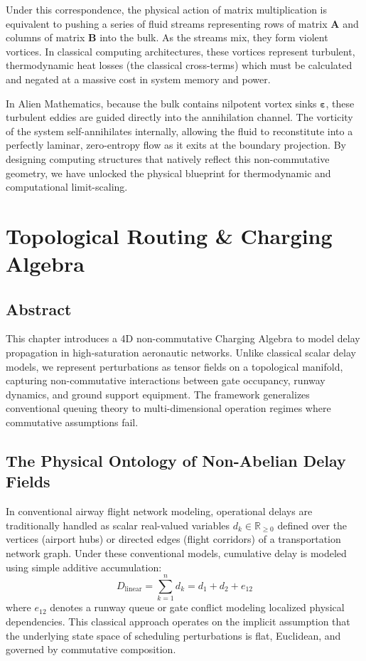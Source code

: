 \documentclass[11pt,a4paper]{book}
\begin{document}
Under this correspondence, the physical action of matrix multiplication is equivalent to pushing a series of fluid streams representing rows of matrix $\mathbf{A}$ and columns of matrix $\mathbf{B}$ into the bulk. 
As the streams mix, they form violent vortices. 
In classical computing architectures, these vortices represent turbulent, thermodynamic heat losses (the classical cross-terms) which must be calculated and negated at a massive cost in system memory and power.

In Alien Mathematics, because the bulk contains nilpotent vortex sinks $\boldsymbol{\varepsilon}$, these turbulent eddies are guided directly into the annihilation channel. 
The vorticity of the system self-annihilates internally, allowing the fluid to reconstitute into a perfectly laminar, zero-entropy flow as it exits at the boundary projection. 
By designing computing structures that natively reflect this non-commutative geometry, we have unlocked the physical blueprint for thermodynamic and computational limit-scaling.

\chapter{Topological Routing \& Charging Algebra}
\section*{Abstract}
This chapter introduces a 4D non-commutative Charging Algebra to model delay propagation in high-saturation aeronautic networks. Unlike classical scalar delay models, we represent perturbations as tensor fields on a topological manifold, capturing non-commutative interactions between gate occupancy, runway dynamics, and ground support equipment. The framework generalizes conventional queuing theory to multi-dimensional operation regimes where commutative assumptions fail.


\section{The Physical Ontology of Non-Abelian Delay Fields}

In conventional airway flight network modeling, operational delays are traditionally handled as scalar real-valued variables $d_k \in \mathbb{R}_{\geq 0}$ defined over the vertices (airport hubs) or directed edges (flight corridors) of a transportation network graph. Under these conventional models, cumulative delay is modeled using simple additive accumulation:
\begin{equation}
\label{eq:classical_delay}
D_{\text{linear}} = \sum_{k=1}^n d_k = d_1 + d_2 + e_{12}
\end{equation}
where $e_{12}$ denotes a runway queue or gate conflict modeling localized physical dependencies. This classical approach operates on the implicit assumption that the underlying state space of scheduling perturbations is flat, Euclidean, and governed by commutative composition.
\end{document}
